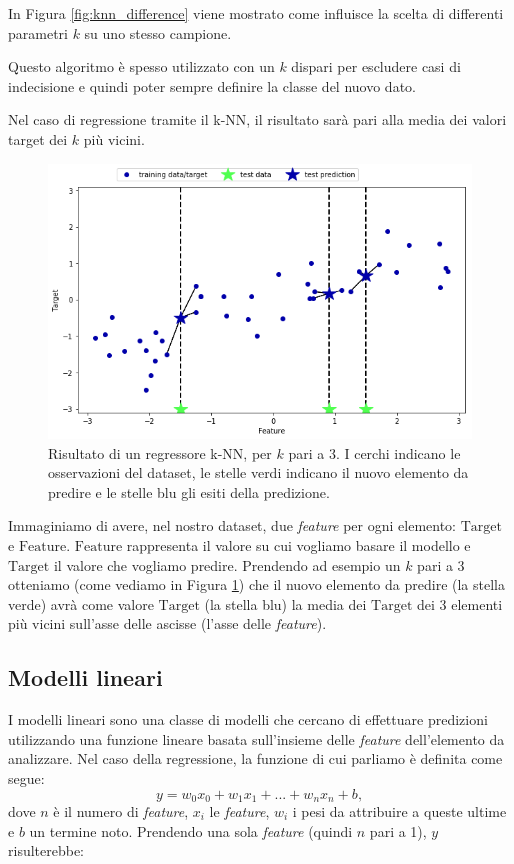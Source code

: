 \documentclass[12pt,italian]{report}
\begin{document}
In Figura \ref{fig:knn_difference} viene mostrato come influisce la scelta di differenti parametri $ k $ su uno stesso campione.

Questo algoritmo è spesso utilizzato con un $ k $ dispari per escludere casi di indecisione e quindi poter sempre definire la classe del nuovo dato.

Nel caso di regressione tramite il k-NN, il risultato sarà pari alla media dei valori target dei $ k $ più vicini.
\begin{figure}[h!]
	\center
	\includegraphics[scale=0.6]{../img/knn_regressor}
	\caption{Risultato di un regressore k-NN, per $k$ pari a 3. I cerchi indicano le osservazioni del dataset, le stelle verdi indicano il nuovo elemento da predire e le stelle blu gli esiti della predizione.}
	\label{fig:knn_regressor}
\end{figure}
Immaginiamo di avere, nel nostro dataset, due \emph{feature} per ogni elemento: $ \mathrm{Target} $ e $ \mathrm{Feature} $. $ \mathrm{Feature} $ rappresenta il valore su cui vogliamo basare il modello e $ \mathrm{Target} $ il valore che vogliamo predire. Prendendo ad esempio un $ k $ pari a 3 otteniamo (come vediamo in Figura \ref{fig:knn_regressor}) che il nuovo elemento da predire (la stella verde) avrà come valore $ \mathrm{Target} $ (la stella blu) la media dei $ \mathrm{Target} $ dei 3  elementi più vicini sull'asse delle ascisse (l'asse delle \emph{feature}).


\subsection{Modelli lineari}
I modelli lineari sono una classe di modelli che cercano di effettuare predizioni utilizzando una funzione lineare basata sull'insieme delle \emph{feature} dell'elemento da analizzare. 
Nel caso della regressione, la funzione di cui parliamo è definita come segue:
\[ y = w_{0}x_{0} + w_{1}x_{1} + ... + w_{n}x_{n} + b ,\]
dove $n$ è il numero di \emph{feature}, $x_{i}$ le \emph{feature}, $ w_{i} $ i pesi da attribuire a queste ultime e $ b $ un termine noto.
Prendendo una sola \emph{feature} (quindi $ n $ pari a 1), $ y $ risulterebbe:
\end{document}
